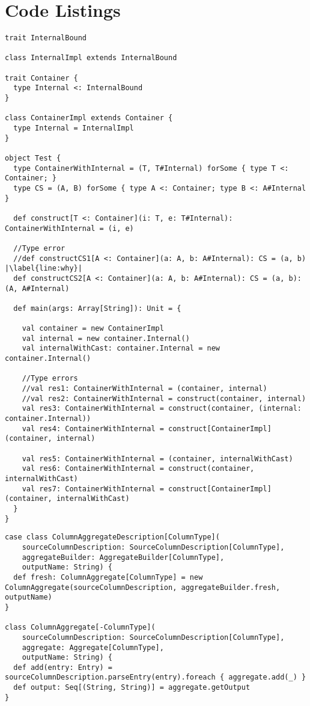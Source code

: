 \appendix
\chapter{Code Listings}
\begin{lstlisting}[caption=Existential inference, label=code:existentials, escapechar=|, float, floatplacement=H]
trait InternalBound

class InternalImpl extends InternalBound

trait Container {
  type Internal <: InternalBound
}

class ContainerImpl extends Container {
  type Internal = InternalImpl
}

object Test {
  type ContainerWithInternal = (T, T#Internal) forSome { type T <: Container; }
  type CS = (A, B) forSome { type A <: Container; type B <: A#Internal }

  def construct[T <: Container](i: T, e: T#Internal): ContainerWithInternal = (i, e)

  //Type error
  //def constructCS1[A <: Container](a: A, b: A#Internal): CS = (a, b) |\label{line:why}|
  def constructCS2[A <: Container](a: A, b: A#Internal): CS = (a, b): (A, A#Internal)

  def main(args: Array[String]): Unit = {

    val container = new ContainerImpl
    val internal = new container.Internal()
    val internalWithCast: container.Internal = new container.Internal()

    //Type errors
    //val res1: ContainerWithInternal = (container, internal)
    //val res2: ContainerWithInternal = construct(container, internal)
    val res3: ContainerWithInternal = construct(container, (internal: container.Internal))
    val res4: ContainerWithInternal = construct[ContainerImpl](container, internal)

    val res5: ContainerWithInternal = (container, internalWithCast)
    val res6: ContainerWithInternal = construct(container, internalWithCast)
    val res7: ContainerWithInternal = construct[ContainerImpl](container, internalWithCast)
  }
}
\end{lstlisting}

\begin{lstlisting}[caption=ColumnAggregateDescription, label=code:cad]
case class ColumnAggregateDescription[ColumnType](
    sourceColumnDescription: SourceColumnDescription[ColumnType],
    aggregateBuilder: AggregateBuilder[ColumnType],
    outputName: String) {
  def fresh: ColumnAggregate[ColumnType] = new ColumnAggregate(sourceColumnDescription, aggregateBuilder.fresh, outputName)
}

class ColumnAggregate[-ColumnType](
    sourceColumnDescription: SourceColumnDescription[ColumnType],
    aggregate: Aggregate[ColumnType],
    outputName: String) {
  def add(entry: Entry) = sourceColumnDescription.parseEntry(entry).foreach { aggregate.add(_) }
  def output: Seq[(String, String)] = aggregate.getOutput
}
\end{lstlisting}

